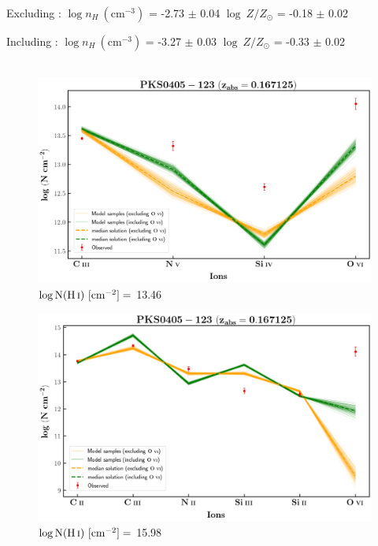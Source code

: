   Excluding  : $\log n_H \ (\text{cm}^{-3})$ = -2.73 $\pm$ 0.04 \hspace{10mm} $\log \ Z/Z_\odot$ = -0.18 $\pm$ 0.02
  
  Including  : $\log n_H \ (\text{cm}^{-3})$ = -3.27 $\pm$ 0.03 \hspace{10mm} $\log \ Z/Z_\odot$ = -0.33 $\pm$ 0.02
  \\\\
  
  \begin{figure}[!h]
    \centering
    \includegraphics[width=0.9\linewidth]{Ionisation-Modelling-Plots/pks0405-z=0.167125-compII.png}
    \caption{$\log \text{N}(\ion{H}{i}) \ [\text{cm}^{-2}]=$ 13.46}
  \end{figure}
  
  
  \newpage
  
  \begin{figure}[!h]
    \centering
    \includegraphics[width=0.9\linewidth]{Ionisation-Modelling-Plots/pks0405-z=0.167125-compIV.png}
    \caption{$\log \text{N}(\ion{H}{i}) \ [\text{cm}^{-2}]=$ 15.98}
  \end{figure}
  
